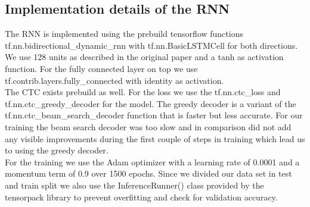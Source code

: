 \documentclass{utue} %
\begin{document}
\subsection{Implementation details of the RNN}
The RNN is implemented using the prebuild tensorflow functions tf.nn.bidirectional\_dynamic\_rnn with tf.nn.BasicLSTMCell for both directions. We use 128 units as described in the original paper and a tanh as activation function. For the fully connected layer on top we use tf.contrib.layers.fully\_connected with identity as activation. \\
The CTC exists prebuild as well. For the loss we use the tf.nn.ctc\_loss and tf.nn.ctc\_greedy\_decoder for the model. The greedy decoder is a variant of the tf.nn.ctc\_beam\_search\_decoder function that is faster but less accurate. For our training the beam search decoder was too slow and in comparison did not add any visible improvements during the first couple of steps in training which lead us to using the greedy decoder.  \\
For the training we use the Adam optimizer with a learning rate of 0.0001 and a momentum term of 0.9 over 1500 epochs. Since we divided our data set in test and train split we also use the InferenceRunner() class provided by the tensorpack library to prevent overfitting and check for validation accuracy. 
\end{document}
